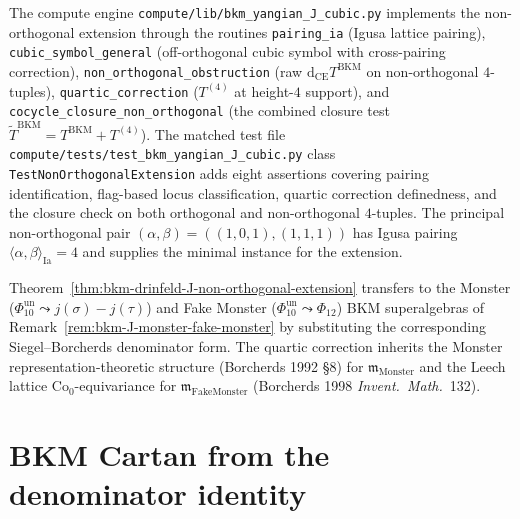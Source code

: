 \begin{remark}
\label{rem:bkm-drinfeld-J-non-orthogonal-engine}
The compute engine
\texttt{compute/lib/bkm\_yangian\_J\_cubic.py} implements the
non-orthogonal extension through the routines
\texttt{pairing\_ia} (Igusa lattice pairing),
\texttt{cubic\_symbol\_general} (off-orthogonal cubic symbol with
cross-pairing correction),
\texttt{non\_orthogonal\_obstruction} (raw
$\mathrm d_{\mathrm{CE}} T^{\mathrm{BKM}}$ on non-orthogonal
$4$-tuples), \texttt{quartic\_correction} ($T^{(4)}$ at height-$4$
support), and \texttt{cocycle\_closure\_non\_orthogonal} (the
combined closure test
$\widetilde T^{\mathrm{BKM}} = T^{\mathrm{BKM}} + T^{(4)}$).
The matched test file
\texttt{compute/tests/test\_bkm\_yangian\_J\_cubic.py} class
\texttt{TestNonOrthogonalExtension} adds eight assertions covering
pairing identification, flag-based locus classification, quartic
correction definedness, and the closure check on both orthogonal and
non-orthogonal $4$-tuples. The principal non-orthogonal pair
$(\alpha,\beta) = ((1,0,1),(1,1,1))$ has Igusa pairing
$\langle\alpha,\beta\rangle_{\mathrm{Ia}} = 4$ and supplies the minimal
instance for the extension.
\end{remark}

\begin{remark}
\label{rem:bkm-drinfeld-J-non-orthogonal-monsters}
Theorem~\ref{thm:bkm-drinfeld-J-non-orthogonal-extension} transfers
to the Monster (\(\Phi_{10}^{\mathrm{un}}\leadsto j(\sigma)-j(\tau)\)) and Fake Monster
(\(\Phi_{10}^{\mathrm{un}}\leadsto\Phi_{12}\)) BKM superalgebras of
Remark~\ref{rem:bkm-J-monster-fake-monster} by substituting the
corresponding Siegel--Borcherds denominator form. The quartic
correction inherits the Monster representation-theoretic structure
(Borcherds 1992 \S8) for $\mathfrak m_{\mathrm{Monster}}$ and the
Leech lattice $\mathrm{Co}_0$-equivariance for
$\mathfrak m_{\mathrm{FakeMonster}}$ (Borcherds 1998 \emph{Invent.\ Math.}~132).
\end{remark}

\section{BKM Cartan from the denominator identity}
\label{sec:k3ebkm-bkm-cartan-denominator}

